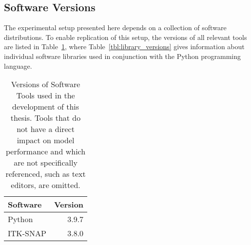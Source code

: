 \subsection{Software Versions}

The experimental setup presented here depends on a collection of software 
distributions. To enable replication of this setup, the versions of all relevant
tools are listed in Table~\ref{tbl:software_versions}, where 
Table~\ref{tbl:library_versions} gives information about individual software 
libraries used in conjunction with the Python programming language.

\begin{table}[H]
  \begin{tabularx}{\textwidth}{X r}
    Software & Version\\\hline
    Python & 3.9.7 \\
    ITK-SNAP & 3.8.0 \\
  \end{tabularx}
  \caption{Versions of Software Tools used in the development of this thesis. 
  Tools that do not have a direct impact on model performance and which are not 
  specifically referenced, such as text editors, are omitted.}\label{tbl:software_versions}
\end{table}

